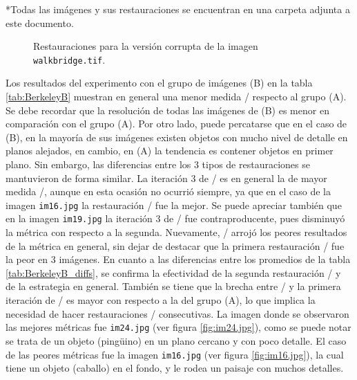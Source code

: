 \begin{scriptsize}
	*Todas las im\'agenes y sus restauraciones se encuentran en una carpeta adjunta a este documento.
\end{scriptsize}

\begin{figure}[H]
	\centering
	\caption{Restauraciones para la versi\'on corrupta de la imagen \texttt{walkbridge.tif}.}
	\label{fig:walkbridge.tif}
\end{figure}


Los resultados del experimento con el grupo de im\'agenes (B) en la tabla \ref{tab:BerkeleyB} muestran en general una menor medida \PSNR/ respecto al grupo (A). Se debe recordar que la resoluci\'on de todas las im\'agenes de (B) es menor en comparaci\'on con el grupo (A). Por otro lado, puede percatarse que en el caso de (B), en la mayor\'ia de sus im\'agenes existen objetos con mucho nivel de detalle en planos alejados, en cambio, en (A) la tendencia es contener objetos en primer plano. Sin embargo, las diferencias entre los 3 tipos de restauraciones se mantuvieron de forma similar. La iteraci\'on 3 de \SOP/ es en general la de mayor medida \PSNR/, aunque en esta ocasión no ocurrió siempre, ya que en el caso de la imagen \texttt{im16.jpg} la restauraci\'on \NS/ fue la mejor. Se puede apreciar tambi\'en que en la imagen \texttt{im19.jpg} la iteraci\'on 3 de \SOP/ fue contraproducente, pues disminuy\'o la métrica con respecto a la segunda. Nuevamente, \TELEA/ arroj\'o los peores resultados de la m\'etrica en general, sin dejar de destacar que la primera restauración \SOP/ fue la peor en 3 im\'agenes. En cuanto a las diferencias entre los promedios de la tabla \ref{tab:BerkeleyB_diffs}, se confirma la efectividad de la segunda restauraci\'on \SOP/ y de la estrategia en general. Tambi\'en se tiene que la brecha entre \NS/ y la primera iteraci\'on de \SOP/ es mayor con respecto a la del grupo (A), lo que implica la necesidad de hacer restauraciones \SOP/ consecutivas. La imagen donde se observaron las mejores m\'etricas fue \texttt{im24.jpg} (ver figura \ref{fig:im24.jpg}), como se puede notar se trata de un objeto (ping\"uino) en un plano cercano y con poco detalle. El caso de las peores m\'etricas fue la imagen \texttt{im16.jpg} (ver figura \ref{fig:im16.jpg}), la cual tiene un objeto (caballo) en el fondo, y le rodea un paisaje con muchos detalles.

